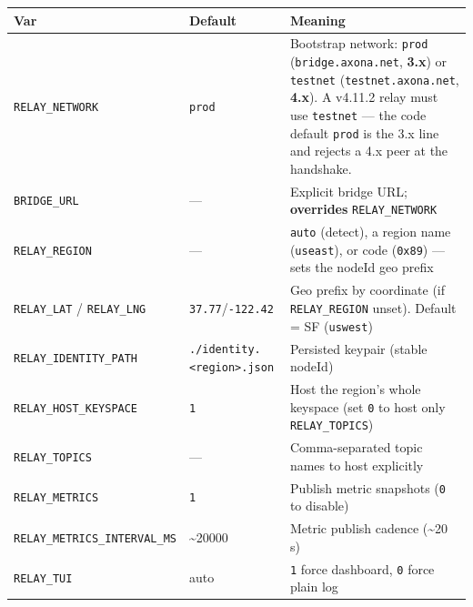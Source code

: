 \documentclass[
  nobib]{tufte-handout}
\newcounter{none} %
\begin{document}
{\def\LTcaptype{none} %
\begin{longtable}[]{@{}
  >{\raggedright\arraybackslash}p{}
  >{\raggedright\arraybackslash}p{}
  >{\raggedright\arraybackslash}p{}@{}}
\toprule\noalign{}
\begin{minipage}[b]{\linewidth}\raggedright
Var
\end{minipage} & \begin{minipage}[b]{\linewidth}\raggedright
Default
\end{minipage} & \begin{minipage}[b]{\linewidth}\raggedright
Meaning
\end{minipage} \\
\midrule\noalign{}
\endhead
\bottomrule\noalign{}
\endlastfoot
\texttt{RELAY\_NETWORK} & \texttt{prod} & Bootstrap network:
\texttt{prod} (\texttt{bridge.axona.net}, \textbf{3.x}) or
\texttt{testnet} (\texttt{testnet.axona.net}, \textbf{4.x}). A v4.11.2
relay must use \texttt{testnet} --- the code default \texttt{prod} is
the 3.x line and rejects a 4.x peer at the handshake. \\
\texttt{BRIDGE\_URL} & --- & Explicit bridge URL; \textbf{overrides}
\texttt{RELAY\_NETWORK} \\
\texttt{RELAY\_REGION} & --- & \texttt{auto} (detect), a region name
(\texttt{useast}), or code (\texttt{0x89}) --- sets the nodeId geo
prefix \\
\texttt{RELAY\_LAT} / \texttt{RELAY\_LNG} &
\texttt{37.77}/\texttt{-122.42} & Geo prefix by coordinate (if
\texttt{RELAY\_REGION} unset). Default = SF (\texttt{uswest}) \\
\texttt{RELAY\_IDENTITY\_PATH} &
\texttt{./identity.\textless{}region\textgreater{}.json} & Persisted
keypair (stable nodeId) \\
\texttt{RELAY\_HOST\_KEYSPACE} & \texttt{1} & Host the region's whole
keyspace (set \texttt{0} to host only \texttt{RELAY\_TOPICS}) \\
\texttt{RELAY\_TOPICS} & --- & Comma-separated topic names to host
explicitly \\
\texttt{RELAY\_METRICS} & \texttt{1} & Publish metric snapshots
(\texttt{0} to disable) \\
\texttt{RELAY\_METRICS\_INTERVAL\_MS} & \textasciitilde20000 & Metric
publish cadence (\textasciitilde20 s) \\
\texttt{RELAY\_TUI} & auto & \texttt{1} force dashboard, \texttt{0}
force plain log \\
\end{longtable}
}
\end{document}
